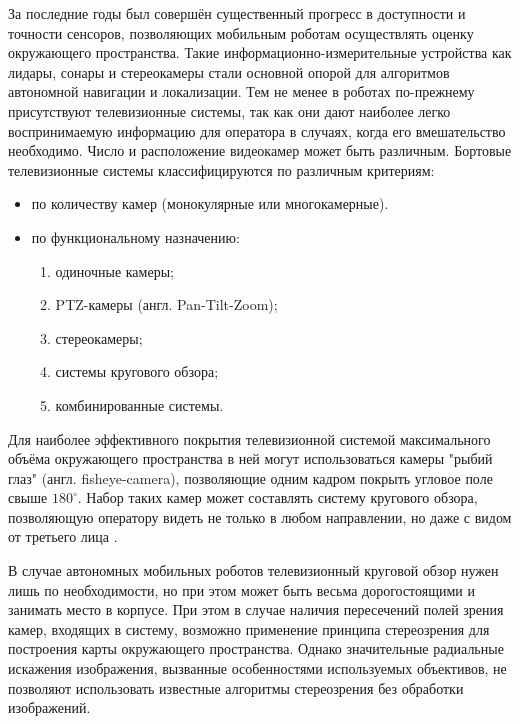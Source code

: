 За последние годы был совершён существенный прогресс в доступности и точности сенсоров, позволяющих мобильным роботам 
осуществлять оценку окружающего пространства. Такие информационно-измерительные устройства как лидары, сонары и стереокамеры
 стали основной опорой для алгоритмов автономной навигации и локализации. Тем не менее в роботах по-прежнему 
присутствуют телевизионные системы, так как они дают наиболее легко воспринимаемую информацию для оператора в случаях, когда 
его вмешательство необходимо. 
Число и расположение видеокамер может быть различным. Бортовые телевизионные системы классифицируются по различным 
критериям\cite{varlashin}:
\begin{itemize} 
    \item по количеству камер (монокулярные или многокамерные).
    \item по функциональному назначению:
    \begin{enumerate}[leftmargin=12mm]  %
        \item одиночные камеры;
        \item PTZ-камеры (англ. Pan-Tilt-Zoom);
        \item стереокамеры;
        \item системы кругового обзора;
        \item комбинированные системы.
    \end{enumerate}
\end{itemize}

Для наиболее эффективного покрытия телевизионной системой максимального объёма окружающего пространства в ней могут использоваться 
камеры "рыбий глаз" (англ. fisheye-camera), позволяющие одним кадром покрыть угловое поле свыше $180^\circ$.  
Набор таких камер может составлять систему кругового обзора, позволяющую оператору видеть не только в любом направлении,                
но даже с видом от третьего лица \cite{birdeye}. 
    
В случае автономных мобильных роботов телевизионный круговой обзор нужен лишь по необходимости, но при этом может быть весьма 
дорогостоящими и занимать место в корпусе. При этом в случае наличия пересечений полей зрения камер, входящих в систему, возможно 
применение принципа стереозрения для построения карты окружающего пространства. Однако значительные радиальные искажения изображения, вызванные особенностями используемых объективов,
 не позволяют использовать известные алгоритмы стереозрения без обработки изображений.                                   
 
